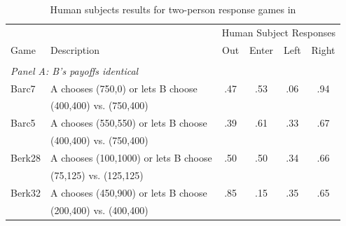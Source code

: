 \documentclass[11pt]{article}
\theoremstyle{definition}
\begin{document}
\begin{table}[h!]
\caption{Human subjects results for two-person response games in \cite{charness2002understanding}}
\label{tab:cr_games_results}
\begin{center}
\footnotesize
\begin{tabular}{llcccc}
\hline
& & \multicolumn{4}{c}{Human Subject Responses} \\
Game & Description & Out & Enter & Left & Right \\
\hline
\\[-1.8ex]
\multicolumn{6}{l}{\textit{Panel A: B's payoffs identical}} \\[0.5ex]
Barc7 & A chooses (750,0) or lets B choose & .47 & .53 & .06 & .94 \\
& (400,400) vs. (750,400) & & & & \\
Barc5 & A chooses (550,550) or lets B choose & .39 & .61 & .33 & .67 \\
& (400,400) vs. (750,400) & & & & \\
Berk28 & A chooses (100,1000) or lets B choose & .50 & .50 & .34 & .66 \\
& (75,125) vs. (125,125) & & & & \\
Berk32 & A chooses (450,900) or lets B choose & .85 & .15 & .35 & .65 \\
& (200,400) vs. (400,400) & & & & \\[1ex]


\end{tabular}
\end{center}
\end{table}
\end{document}
